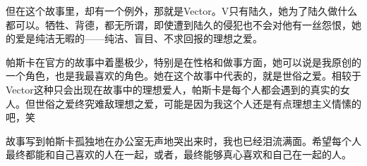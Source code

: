 但在这个故事里，却有一个例外，那就是Vector。V只有陆久，她为了陆久做什么都可以。牺牲、背德，都无所谓，即使遭到陆久的侵犯也不会对他有一丝怨恨，她的爱是纯洁无暇的——纯洁、盲目、不求回报的理想之爱。

帕斯卡在官方的故事中着墨极少，特别是在性格和做事方面，她可以说是我原创的一个角色，也是我最喜欢的角色。她在这个故事中代表的，就是世俗之爱。相较于Vector这种只会出现在故事中的理想爱人，帕斯卡是每个人都会遇到的真实的女人。但世俗之爱终究难敌理想之爱，可能是因为我这个人还是有点理想主义情愫的吧，笑

故事写到帕斯卡孤独地在办公室无声地哭出来时，我也已经泪流满面。希望每个人最终都能和自己喜欢的人在一起，或者，最终能够真心喜欢和自己在一起的人。